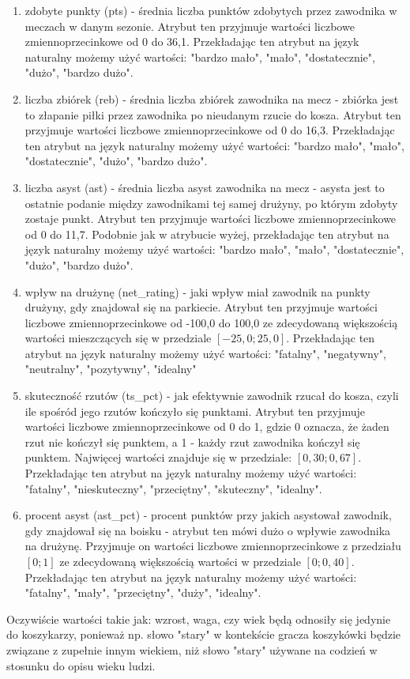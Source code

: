 \documentclass{classrep}
\begin{document}
\begin{itemize}
\begin{enumerate}
        \item zdobyte punkty (pts) - średnia liczba punktów zdobytych przez zawodnika w meczach w danym sezonie. Atrybut ten przyjmuje wartości liczbowe zmiennoprzecinkowe od 0 do 36,1. Przekładając ten atrybut na język naturalny możemy użyć wartości: "bardzo mało", "mało", "dostatecznie", "dużo", "bardzo dużo".
        \item liczba zbiórek (reb) - średnia liczba zbiórek zawodnika na mecz - zbiórka jest to złapanie piłki przez zawodnika po nieudanym rzucie do kosza. Atrybut ten przyjmuje wartości liczbowe zmiennoprzecinkowe od 0 do 16,3. Przekładając ten atrybut na język naturalny możemy użyć wartości: "bardzo mało", "mało", "dostatecznie", "dużo", "bardzo dużo".
        \item liczba asyst (ast) - średnia liczba asyst zawodnika na mecz - asysta jest to ostatnie podanie między zawodnikami tej samej drużyny, po którym zdobyty zostaje punkt. Atrybut ten przyjmuje wartości liczbowe zmiennoprzecinkowe od 0 do 11,7. Podobnie jak w atrybucie wyżej, przekładając ten atrybut na język naturalny możemy użyć wartości: "bardzo mało", "mało", "dostatecznie", "dużo", "bardzo dużo".
        \item wpływ na drużynę (net\_rating) - jaki wpływ miał zawodnik na punkty drużyny, gdy znajdował się na parkiecie. Atrybut ten przyjmuje wartości liczbowe zmiennoprzecinkowe od -100,0 do 100,0 ze zdecydowaną większością wartości mieszczących się w przedziale $[-25,0; 25,0]$. Przekładając ten atrybut na język naturalny możemy użyć wartości:
        "fatalny", "negatywny", "neutralny", "pozytywny", "idealny"
        \item skuteczność rzutów (ts\_pct) - jak efektywnie zawodnik rzucał do kosza, czyli ile spośród jego rzutów kończyło się punktami. Atrybut ten przyjmuje wartości liczbowe zmiennoprzecinkowe od 0 do 1, gdzie 0 oznacza, że żaden rzut nie kończył się punktem, a 1 - każdy rzut zawodnika kończył się punktem. Najwięcej wartości znajduje się w przedziale: $[0,30; 0,67]$.  Przekładając ten atrybut na język naturalny możemy użyć wartości: "fatalny", "nieskuteczny", "przeciętny", "skuteczny", "idealny".
        \item procent asyst (ast\_pct) - procent punktów przy jakich asystował zawodnik, gdy znajdował się na boisku - atrybut ten mówi dużo o wpływie zawodnika na drużynę. Przyjmuje on wartości liczbowe zmiennoprzecinkowe z przedziału $[0;1]$ ze zdecydowaną większością wartości w przedziale $[0; 0,40]$. Przekładając ten atrybut na język naturalny możemy użyć wartości: "fatalny", "mały", "przeciętny", "duży", "idealny".
    \end{enumerate}
\end{itemize}
Oczywiście wartości takie jak: wzrost, waga, czy wiek będą odnosiły się jedynie do koszykarzy, ponieważ np. słowo "stary" w kontekście gracza koszykówki będzie związane z zupełnie innym wiekiem, niż słowo "stary" używane na codzień w stosunku do opisu wieku ludzi. \\
\end{document}
